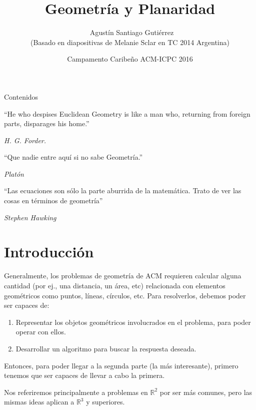 \documentclass[compress]{beamer}
\title[Geometr\'ia y Planaridad] %
{Geometr\'ia y Planaridad}
\author[Agustín Gutiérrez] %
{~Agustín Santiago Gutiérrez \\ {\tiny (Basado en diapositivas de Melanie Sclar en TC 2014 Argentina)}}
\institute[UBA] %
{
  Facultad de Ciencias Exactas y Naturales\\
  Universidad de Buenos Aires
}
\date[CC 2016] %
{Campamento Caribeño ACM-ICPC 2016}
\begin{document}
\begin{frame}
  \titlepage
\end{frame}

\begin{frame}{Contenidos}
  \tableofcontents
\end{frame}

\begin{frame}

``He who despises Euclidean Geometry is like a man who, returning from foreign parts, disparages his home.''

\hfill \textit{H. G. Forder.}

\vfill

``Que nadie entre aquí si no sabe Geometría.''

\hfill \textit{Platón}

\vfill

``Las ecuaciones son sólo la parte aburrida de la matemática. Trato de ver las cosas en términos de geometría''

\hfill \textit{Stephen Hawking}

\end{frame}

\section{Introducci\'on}
\begin{frame}

Generalmente, los problemas de geometr\'ia de ACM requieren calcular 
alguna cantidad (por ej., una distancia, un \'area, etc) relacionada con
elementos geom\'etricos como puntos, l\'ineas, c\'irculos, etc.
Para resolverlos, debemos poder ser capaces de:\\
\bigskip
\begin{enumerate}
\item Representar los objetos geom\'etricos involucrados en el problema, 
para poder operar con ellos.

\item Desarrollar un algoritmo para buscar la respuesta deseada.
\end{enumerate}

Entonces, para poder llegar a la segunda parte (la m\'as interesante), primero tenemos que ser capaces de llevar a cabo la primera.

\bigskip

Nos referiremos principalmente a problemas en $\mathbb{R}^2$ por ser más comunes, pero las mismas ideas aplican a $\mathbb{R}^3$ y superiores.

\end{frame}
\end{document}
